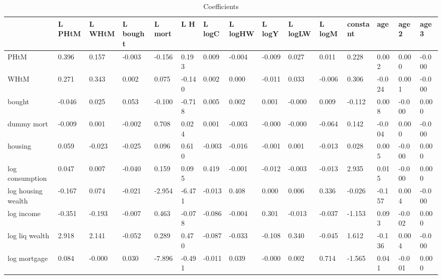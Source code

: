 \begin{table}[htbp]
\caption{\label{clabel} Coefficients}\centering\medskip
\begin{tabular}{lllllllllllllll} \hline \hline
 & L PHtM  & L WHtM  & L bought  & L mort  & L H  & L logC  & L logHW  & L logY  & L logLW  & L logM  & constant  & age  & age2  & age3  \\  \hline 
PHtM &     0.396 &     0.157 &    -0.003 &    -0.156 &     0.193 &     0.009 &    -0.004 &    -0.009 &     0.027 &     0.011 &     0.228 &     0.002 &     0.000 &    -0.000 \\  
WHtM &     0.271 &     0.343 &     0.002 &     0.075 &    -0.140 &     0.002 &     0.000 &    -0.011 &     0.033 &    -0.006 &     0.306 &    -0.024 &     0.001 &    -0.000 \\  
bought &    -0.046 &     0.025 &     0.053 &    -0.100 &    -0.718 &     0.005 &     0.002 &     0.001 &    -0.000 &     0.009 &    -0.112 &     0.008 &    -0.000 &     0.000 \\  
dummy mort &    -0.009 &     0.001 &    -0.002 &     0.708 &     0.024 &     0.001 &    -0.003 &    -0.000 &    -0.000 &    -0.064 &     0.142 &    -0.004 &     0.000 &    -0.000 \\  
housing &     0.059 &    -0.023 &    -0.025 &     0.096 &     0.610 &    -0.003 &    -0.016 &    -0.001 &     0.001 &    -0.013 &     0.028 &     0.005 &    -0.000 &     0.000 \\  
log consumption &     0.047 &     0.007 &    -0.040 &     0.159 &     0.095 &     0.419 &    -0.001 &    -0.012 &    -0.003 &    -0.013 &     2.935 &     0.015 &    -0.000 &     0.000 \\  
log housing wealth &    -0.167 &     0.074 &    -0.021 &    -2.954 &    -6.471 &    -0.013 &     0.408 &     0.000 &     0.006 &     0.336 &    -0.026 &    -0.157 &     0.004 &    -0.000 \\  
log income &    -0.351 &    -0.193 &    -0.007 &     0.463 &    -0.078 &    -0.086 &    -0.004 &     0.301 &    -0.013 &    -0.037 &    -1.153 &     0.093 &    -0.002 &     0.000 \\  
log liq wealth &     2.918 &     2.141 &    -0.052 &     0.289 &     0.470 &    -0.087 &    -0.033 &    -0.108 &     0.340 &    -0.045 &     1.612 &    -0.136 &     0.004 &    -0.000 \\  
log mortgage &     0.084 &    -0.000 &     0.030 &    -7.896 &    -0.491 &    -0.011 &     0.039 &    -0.000 &     0.002 &     0.714 &    -1.565 &     0.041 &    -0.001 &     0.000 \\  
\hline \hline \end{tabular}
\end{table}
